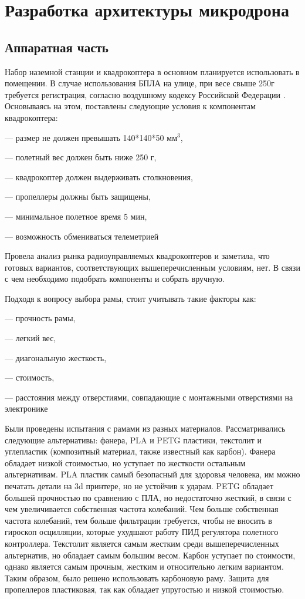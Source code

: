 
\section{Разработка архитектуры микродрона}
\subsection{Аппаратная часть}

Набор наземной станции и квадрокоптера в основном планируется использовать в помещении. В случае использования БПЛА на улице, при весе свыше 250г требуется регистрация, согласно воздушному кодексу Российской Федерации\cite{ivp} . Основываясь на этом, поставлены следующие условия к компонентам квадрокоптера:

--- размер не должен превышать 140*140*50 \(мм^3\),

--- полетный вес должен быть ниже 250 г,

--- квадрокоптер должен выдерживать столкновения,

--- пропеллеры должны быть защищены,

--- минимальное полетное время 5 мин,

--- возможность обмениваться телеметрией

Провела анализ рынка радиоуправляемых квадрокоптеров и заметила, что готовых вариантов, соответствующих вышеперечисленным условиям, нет. В связи с чем необходимо подобрать компоненты и собрать вручную.

Подходя к вопросу выбора рамы, стоит учитывать такие факторы как:

--- прочность рамы,

--- легкий вес,

--- диагональную жесткость,

--- стоимость,

--- расстояния между отверстиями, совпадающие с монтажными отверстиями на электронике

Были проведены испытания с рамами из разных материалов. Рассматривались следующие альтернативы: фанера, PLA и PETG пластики, текстолит и углепластик (композитный материал, также известный как карбон). Фанера обладает низкой стоимостью, но уступает по жесткости остальным альтернативам. PLA пластик самый безопасный для здоровья человека, им можно печатать детали на 3d принтере, но не устойчив к ударам. PETG обладает большей прочностью по сравнению с ПЛА, но недостаточно жесткий, в связи с чем увеличивается собственная частота колебаний. Чем больше собственная частота колебаний, тем больше фильтрации требуется, чтобы не вносить в гироскоп осцилляции, которые ухудшают работу ПИД регулятора полетного контроллера. Текстолит является самым жестким среди вышеперечисленных альтернатив, но обладает самым большим весом. Карбон уступает по стоимости, однако является самым прочным, жестким и относительно легким вариантом. Таким образом, было решено использовать карбоновую раму.
Защита для пропеллеров пластиковая, так как обладает упругостью и низкой стоимостью.

